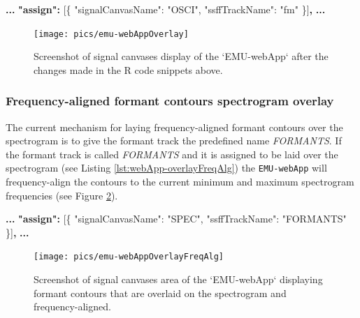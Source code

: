 \documentclass[]{book}
\newenvironment{Shaded}{\begin{snugshade}}{\end{snugshade}}
\newcommand{\DataTypeTok}[1]{\textcolor[rgb]{0.13,0.29,0.53}{#1}}
\newcommand{\ErrorTok}[1]{\textcolor[rgb]{0.64,0.00,0.00}{\textbf{#1}}}
\newcommand{\FunctionTok}[1]{\textcolor[rgb]{0.00,0.00,0.00}{#1}}
\newcommand{\OtherTok}[1]{\textcolor[rgb]{0.56,0.35,0.01}{#1}}
\newcommand{\StringTok}[1]{\textcolor[rgb]{0.31,0.60,0.02}{#1}}
\begin{document}
\begin{Shaded}
\begin{Highlighting}[]
\ErrorTok{...}
\ErrorTok{"assign":} \OtherTok{[}\FunctionTok{\{}
    \DataTypeTok{"signalCanvasName"}\FunctionTok{:} \StringTok{"OSCI"}\FunctionTok{,}
    \DataTypeTok{"ssffTrackName"}\FunctionTok{:} \StringTok{"fm"}
\FunctionTok{\}}\OtherTok{]}\ErrorTok{,}
\ErrorTok{...}
\end{Highlighting}
\end{Shaded}

\begin{figure}

{\centering \texttt{[image: pics/emu-webAppOverlay]} 

}

\caption{Screenshot of signal canvases display of the `EMU-webApp` after the changes made in the R code snippets above.}\label{fig:webApp-overlay1}
\end{figure}

\hypertarget{subsubsec:emu-webAppFreqAlignedFormants}{%
\subsubsection{Frequency-aligned formant contours spectrogram overlay}\label{subsubsec:emu-webAppFreqAlignedFormants}}

The current mechanism for laying frequency-aligned formant contours over the spectrogram is to give the formant track the predefined name \emph{FORMANTS}. If the formant track is called \emph{FORMANTS} and it is assigned to be laid over the spectrogram (see Listing \ref{lst:webApp-overlayFreqAlg}) the \texttt{EMU-webApp} will frequency-align the contours to the current minimum and maximum spectrogram frequencies (see Figure \ref{fig:webApp-overlay2}).

\begin{Shaded}
\begin{Highlighting}[]
\ErrorTok{...}
\ErrorTok{"assign":} \OtherTok{[}\FunctionTok{\{}
    \DataTypeTok{"signalCanvasName"}\FunctionTok{:} \StringTok{"SPEC"}\FunctionTok{,}
    \DataTypeTok{"ssffTrackName"}\FunctionTok{:} \StringTok{"FORMANTS"}
\FunctionTok{\}}\OtherTok{]}\ErrorTok{,}
\ErrorTok{...}
\end{Highlighting}
\end{Shaded}

\begin{figure}

{\centering \texttt{[image: pics/emu-webAppOverlayFreqAlg]} 

}

\caption{Screenshot of signal canvases area of the `EMU-webApp` displaying formant contours that are overlaid on the spectrogram and frequency-aligned.}\label{fig:webApp-overlay2}
\end{figure}
\end{document}
